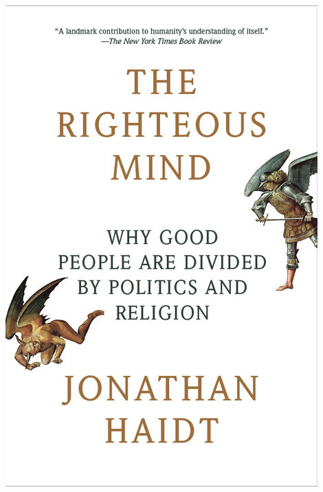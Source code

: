 \documentclass{tufte-handout}
\makeatletter
\newcommand{\varcaption}[2][0pt]{%
  \gsetlength{\@tufte@caption@vertical@offset}{-#1}%
  \gdef\@tufte@stored@varcaption{#2}%
}
\gdef\@tufte@stored@varcaption{} %
\makeatother
\begin{document}
\begin{marginfigure}[-16\baselineskip]
   \includegraphics[width=\linewidth]{images/righteous_mind.jpg}
   \varcaption{\href{https://www.penguinrandomhouse.com/books/73535/the-righteous-mind-by-jonathan-haidt/}{Publisher Link}, \href{https://www.amazon.com/Righteous-Mind-Divided-Politics-Religion/dp/0307455777}{Amazon Link}}
\end{marginfigure}
\end{document}
